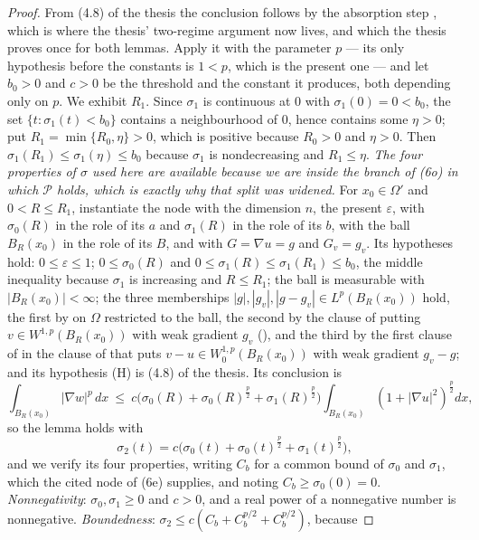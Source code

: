 \begin{proof}
From (4.8) of the thesis the conclusion follows by the absorption step
, which is where the thesis' two-regime
argument now lives, and which the thesis proves once for both lemmas.  Apply it
with the parameter $p$ --- its only hypothesis before the constants is $1<p$,
which is the present one --- and let $b_0>0$ and $c>0$ be the threshold and the
constant it produces, both depending only on $p$.  We exhibit $R_1$.  Since
$\sigma_1$ is continuous at $0$ with $\sigma_1(0)=0<b_0$, the set
$\{t:\sigma_1(t)<b_0\}$ contains a neighbourhood of $0$, hence contains some
$\eta>0$; put $R_1=\min\{R_0,\eta\}>0$, which is positive because $R_0>0$ and
$\eta>0$.  Then $\sigma_1(R_1)\le\sigma_1(\eta)\le b_0$ because $\sigma_1$ is
nondecreasing and $R_1\le\eta$.  \emph{The four properties of $\sigma$ used
here are available because we are inside the branch of \textup{(6o)} in which
$\mathcal P$ holds, which is exactly why that split was widened.}  For
$x_0\in\Omega'$ and $0<R\le R_1$,
instantiate the node with the dimension $n$, the present $\varepsilon$, with
$\sigma_0(R)$ in the role of its $a$ and $\sigma_1(R)$ in the role of its $b$,
with the ball $B_R(x_0)$ in the role of its $B$, and with $G=\nabla u=g$ and
$G_v=g_v$.  Its hypotheses hold: $0\le\varepsilon\le1$; $0\le\sigma_0(R)$ and
$0\le\sigma_1(R)\le\sigma_1(R_1)\le b_0$, the middle inequality because
$\sigma_1$ is increasing and $R\le R_1$; the ball is measurable with
$|B_R(x_0)|<\infty$; the three memberships
$|g|,|g_v|,|g-g_v|\in L^p(B_R(x_0))$ hold, the first by  on
$\Omega$ restricted to the ball, the second by the clause of
 putting $v\in W^{1,p}(B_R(x_0))$ with weak
gradient $g_v$ (), and the third by the first clause of
 in the clause of  that puts
$v-u\in W^{1,p}_0(B_R(x_0))$ with weak gradient $g_v-g$; and its hypothesis (H)
is (4.8) of the thesis.  Its conclusion is
\[
\int_{B_R(x_0)}|\nabla w|^p\,dx\ \le\
c\bigl(\sigma_0(R)+\sigma_0(R)^{\frac p2}+\sigma_1(R)^{\frac p2}\bigr)
\int_{B_R(x_0)}(1+|\nabla u|^2)^{\frac p2}dx ,
\]
so the lemma holds with
\[
\sigma_2(t)=c\bigl(\sigma_0(t)+\sigma_0(t)^{\frac p2}+\sigma_1(t)^{\frac p2}\bigr),
\]
and we verify its four properties, writing $C_b$ for a common bound of
$\sigma_0$ and $\sigma_1$, which the cited node of (6e) supplies, and noting
$C_b\ge\sigma_0(0)=0$.  \emph{Nonnegativity}: $\sigma_0,\sigma_1\ge0$ and
$c>0$, and a real power of a nonnegative number is nonnegative.
\emph{Boundedness}: $\sigma_2\le c(C_b+C_b^{p/2}+C_b^{p/2})$, because

\end{proof}
